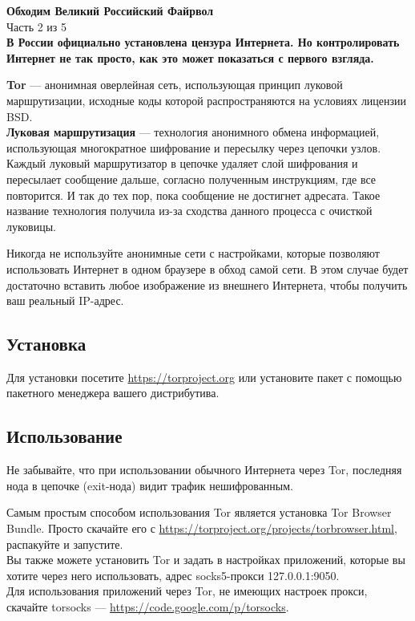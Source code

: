 \begin{center}
\LARGE \textbf{Обходим Великий Российский Файрвол}\\
\large Часть 2 из 5\\
\normalsize\textbf{В России официально установлена цензура Интернета. Но контролировать Интернет не так просто, как это может показаться с первого взгляда.}
\end{center}
\begin{figure}[h]
\end{figure}
\textbf{Tor} --- анонимная оверлейная сеть, использующая принцип луковой маршрутизации, исходные коды которой распространяются на условиях лицензии BSD.\\
\textbf{Луковая маршрутизация} --- технология анонимного обмена информацией, использующая многократное шифрование и пересылку через цепочки узлов. Каждый луковый маршрутизатор в цепочке удаляет слой шифрования и пересылает сообщение дальше, согласно полученным инструкциям, где все повторится. И так до тех пор, пока сообщение не достигнет адресата. Такое название технология получила из-за сходства данного процесса с очисткой луковицы.
\begin{important}
Никогда не используйте анонимные сети с настройками, которые позволяют использовать Интернет в одном браузере в обход самой сети. В этом случае будет достаточно вставить любое изображение из внешнего Интернета, чтобы получить ваш реальный IP-адрес.
\end{important}
\subsection*{Установка}
Для установки посетите \url{https://torproject.org} или установите пакет с помощью пакетного менеджера вашего дистрибутива.
\subsection*{Использование}
\begin{important}
Не забывайте, что при использовании обычного Интернета через Tor, последняя нода в цепочке (exit-нода) видит трафик нешифрованным.
\end{important}
Самым простым способом использования Tor является установка Tor Browser Bundle. Просто скачайте его с \url{https://torproject.org/projects/torbrowser.html}, распакуйте и запустите.\\
Вы также можете установить Tor и задать в настройках приложений, которые вы хотите через него использовать, адрес socks5-прокси 127.0.0.1:9050.\\
Для использования приложений через Tor, не имеющих настроек прокси, скачайте torsocks --- \url{https://code.google.com/p/torsocks}.
